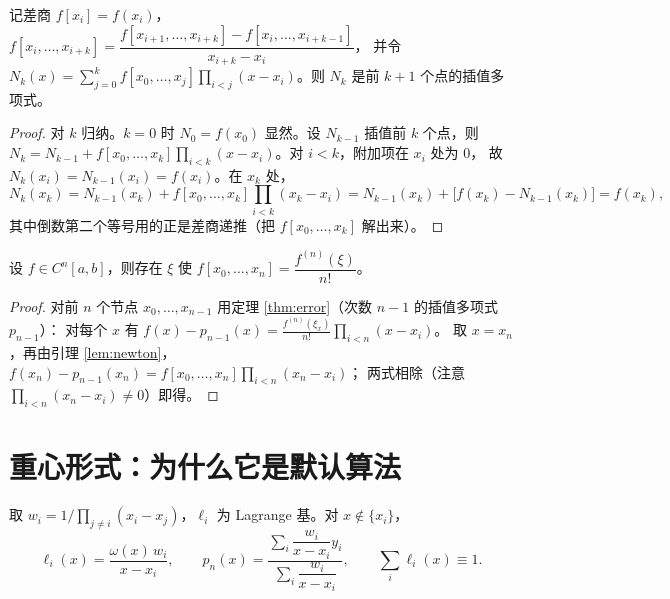 \begin{lemma}
\label{lem:newton}
记差商 $f[x_i]=f(x_i)$，$f[x_i,\dots,x_{i+k}]=\dfrac{f[x_{i+1},\dots,x_{i+k}]-f[x_i,\dots,x_{i+k-1}]}{x_{i+k}-x_i}$，
并令 $N_k(x)=\sum_{j=0}^{k}f[x_0,\dots,x_j]\prod_{i<j}(x-x_i)$。则 $N_k$ 是前 $k+1$ 个点的插值多项式。
\end{lemma}

\begin{proof}
对 $k$ 归纳。$k=0$ 时 $N_0=f(x_0)$ 显然。设 $N_{k-1}$ 插值前 $k$ 个点，则
$N_k=N_{k-1}+f[x_0,\dots,x_k]\prod_{i<k}(x-x_i)$。对 $i<k$，附加项在 $x_i$ 处为 $0$，
故 $N_k(x_i)=N_{k-1}(x_i)=f(x_i)$。在 $x_k$ 处，
\[
  N_k(x_k)=N_{k-1}(x_k)+f[x_0,\dots,x_k]\prod_{i<k}(x_k-x_i)=N_{k-1}(x_k)+\bigl[f(x_k)-N_{k-1}(x_k)\bigr]=f(x_k),
\]
其中倒数第二个等号用的正是差商递推（把 $f[x_0,\dots,x_k]$ 解出来）。
\end{proof}

\begin{corollary}[差商的中值定理]
\label{cor:dd}
设 $f\in C^{n}[a,b]$，则存在 $\xi$ 使 $f[x_0,\dots,x_n]=\dfrac{f^{(n)}(\xi)}{n!}$。
\end{corollary}

\begin{proof}
对前 $n$ 个节点 $x_0,\dots,x_{n-1}$ 用定理 \ref{thm:error}（次数 $n-1$ 的插值多项式 $p_{n-1}$）：
对每个 $x$ 有 $f(x)-p_{n-1}(x)=\frac{f^{(n)}(\xi_x)}{n!}\prod_{i<n}(x-x_i)$。
取 $x=x_n$，再由引理 \ref{lem:newton}，$f(x_n)-p_{n-1}(x_n)=f[x_0,\dots,x_n]\prod_{i<n}(x_n-x_i)$；
两式相除（注意 $\prod_{i<n}(x_n-x_i)\ne0$）即得。
\end{proof}

\section{重心形式：为什么它是默认算法}

\begin{theorem}[重心公式与单位分解]
\label{thm:bary}
取 $w_i=1/\prod_{j\ne i}(x_i-x_j)$，$\ell_i$ 为 Lagrange 基。对 $x\notin\{x_i\}$，
\[
  \ell_i(x)=\frac{\omega(x)\,w_i}{x-x_i},\qquad
  p_n(x)=\frac{\sum_i \dfrac{w_i}{x-x_i}y_i}{\sum_i \dfrac{w_i}{x-x_i}},\qquad
  \sum_i\ell_i(x)\equiv1 .
\]
\end{theorem}

